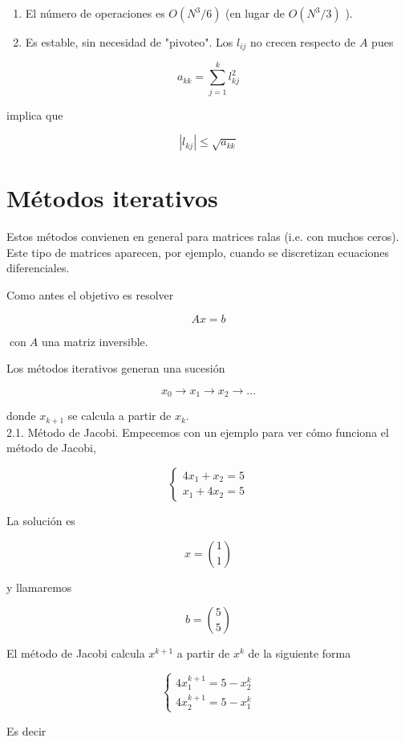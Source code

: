 \documentclass[10pt]{book}
\begin{document}
\begin{enumerate}
  \item El número de operaciones es $O\left(N^{3} / 6\right)$ (en lugar de $O\left(N^{3} / 3\right)$ ).
  \item Es estable, sin necesidad de "pivoteo". Los $l_{i j}$ no crecen respecto de $A$ pues
\end{enumerate}

$$
a_{k k}=\sum_{j=1}^{k} l_{k j}^{2}
$$

implica que

$$
\left|l_{k j}\right| \leq \sqrt{a_{k k}}
$$

\section{Métodos iterativos}
Estos métodos convienen en general para matrices ralas (i.e. con muchos ceros). Este tipo de matrices aparecen, por ejemplo, cuando se discretizan ecuaciones diferenciales.

Como antes el objetivo es resolver

$$
A x=b
$$

$\operatorname{con} A$ una matriz inversible.

Los métodos iterativos generan una sucesión

$$
x_{0} \rightarrow x_{1} \rightarrow x_{2} \rightarrow \ldots
$$

donde $x_{k+1}$ se calcula a partir de $x_{k}$.\\
2.1. Método de Jacobi. Empecemos con un ejemplo para ver cómo funciona el método de Jacobi,

$$
\left\{\begin{array}{l}
4 x_{1}+x_{2}=5 \\
x_{1}+4 x_{2}=5
\end{array}\right.
$$

La solución es

$$
x=\binom{1}{1}
$$

y llamaremos

$$
b=\binom{5}{5}
$$

El método de Jacobi calcula $x^{k+1}$ a partir de $x^{k}$ de la siguiente forma

$$
\left\{\begin{array}{l}
4 x_{1}^{k+1}=5-x_{2}^{k} \\
4 x_{2}^{k+1}=5-x_{1}^{k}
\end{array}\right.
$$

Es decir
\end{document}
